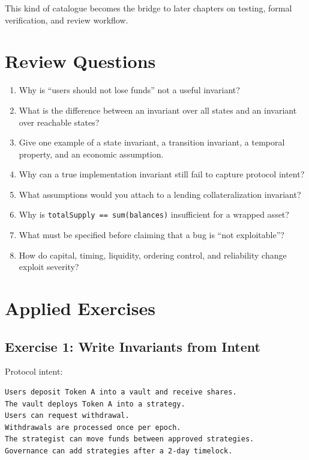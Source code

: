This kind of catalogue becomes the bridge to later chapters on testing,
formal verification, and review workflow.

\section{Review Questions}

\begin{enumerate}
\def\labelenumi{\arabic{enumi}.}
\tightlist
\item
  Why is ``users should not lose funds'' not a useful invariant?
\item
  What is the difference between an invariant over all states and an invariant over reachable states?
\item
  Give one example of a state invariant, a transition invariant, a temporal property, and an economic assumption.
\item
  Why can a true implementation invariant still fail to capture protocol intent?
\item
  What assumptions would you attach to a lending collateralization invariant?
\item
  Why is \passthrough{\lstinline!totalSupply == sum(balances)!} insufficient for a wrapped asset?
\item
  What must be specified before claiming that a bug is ``not exploitable''?
\item
  How do capital, timing, liquidity, ordering control, and reliability change exploit severity?
\end{enumerate}

\section{Applied Exercises}

\subsection{Exercise 1: Write Invariants from Intent}

Protocol intent:

\begin{lstlisting}
Users deposit Token A into a vault and receive shares.
The vault deploys Token A into a strategy.
Users can request withdrawal.
Withdrawals are processed once per epoch.
The strategist can move funds between approved strategies.
Governance can add strategies after a 2-day timelock.
\end{lstlisting}

